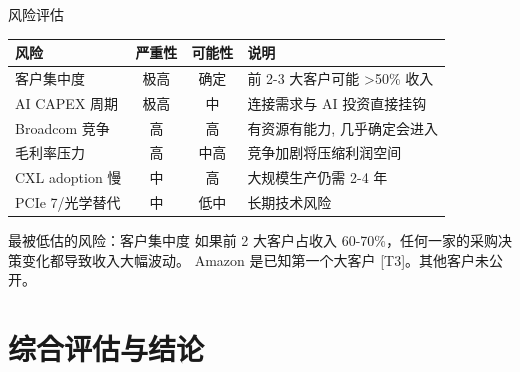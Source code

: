\documentclass[aspectratio=169, 10pt, UTF8]{ctexbeamer}
\newcommand{\sourceT}[1]{{\small\textcolor{ieeeBlue}{[T#1]}}}
\begin{document}
\begin{frame}{风险评估}
  \begin{table}[h]
    \centering
    \begin{tabular}{lccp{}}
      \toprule
      \textbf{风险} & \textbf{严重性} & \textbf{可能性} & \textbf{说明} \\
      \midrule
      \rowcolor{ieeeRed!10}
      客户集中度 & 极高 & 确定 & 前 2-3 大客户可能 >50\% 收入 \\
      \rowcolor{ieeeRed!10}
      AI CAPEX 周期 & 极高 & 中 & 连接需求与 AI 投资直接挂钩 \\
      \rowcolor{ieeeOrange!15}
      Broadcom 竞争 & 高 & 高 & 有资源有能力, 几乎确定会进入 \\
      \rowcolor{ieeeOrange!15}
      毛利率压力 & 高 & 中高 & 竞争加剧将压缩利润空间 \\
      \rowcolor{ieeeOrange!8}
      CXL adoption 慢 & 中 & 高 & 大规模生产仍需 2-4 年 \\
      \rowcolor{ieeeOrange!5}
      PCIe 7/光学替代 & 中 & 低中 & 长期技术风险 \\
      \bottomrule
    \end{tabular}
  \end{table}

  \begin{alertblock}{最被低估的风险：客户集中度}
    如果前 2 大客户占收入 60-70\%，任何一家的采购决策变化都导致收入大幅波动。
    Amazon 是已知第一个大客户 \sourceT{3}。其他客户未公开。
  \end{alertblock}
\end{frame}

\section{综合评估与结论}
\end{document}
